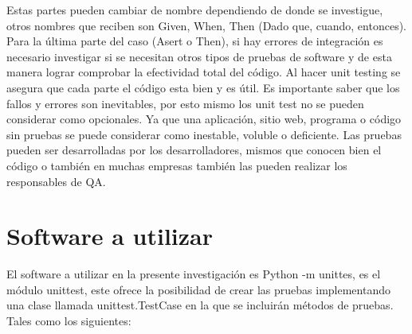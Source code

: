 \documentclass[conference]{IEEEtran}
\begin{document}
Estas partes pueden cambiar de nombre dependiendo de donde se investigue, otros nombres que reciben son Given, When, Then (Dado que, cuando, entonces).
Para la última parte del caso (Asert o Then), si hay errores de integración es necesario investigar si se necesitan otros tipos de pruebas de software y de esta manera lograr comprobar la efectividad total del código.
Al hacer unit testing se asegura que cada parte el código esta bien y es útil. Es importante saber que los fallos y errores son inevitables, por esto mismo los unit test no se pueden considerar como opcionales. Ya que una aplicación, sitio web, programa o código sin pruebas se puede considerar como inestable, voluble o deficiente.
Las pruebas pueden ser desarrolladas por los desarrolladores, mismos que conocen bien el código o también en muchas empresas también las pueden realizar los responsables de QA.

\section{Software a utilizar}

El software a utilizar en la presente investigación es Python -m unittes, es el módulo unittest, este ofrece la posibilidad de crear las pruebas implementando una clase llamada unittest.TestCase en la que se incluirán métodos de pruebas. Tales como los siguientes: 
\end{document}
